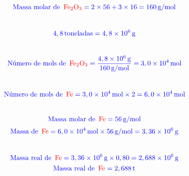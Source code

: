 \documentclass[a4paper, 12pt]{article}
\begin{document}
\begin{enumerate}
          \[
              \textcolor{blue}{\text{Massa molar de } \, \textcolor{red}{\text{Fe}_2\text{O}_3} = 2 \times 56 + 3 \times 16 = 160 \, \text{g/mol}}
          \]
          \\[10pt]
          \textcolor{blue}{}
          \[
              \textcolor{blue}{4,8 \, \text{toneladas} = 4,8 \times 10^6 \, \text{g}}
          \]
          \\[10pt]
          \textcolor{blue}{}
          \[
              \textcolor{blue}{\text{Número de mols de } \, \textcolor{red}{\text{Fe}_2\text{O}_3} = \frac{4,8 \times 10^6 \, \text{g}}{160 \, \text{g/mol}} = 3,0 \times 10^4 \, \text{mol}}
          \]
          \\[10pt]
          \textcolor{blue}{}
          \[
              \textcolor{blue}{\text{Número de mols de } \, \textcolor{red}{\text{Fe}} = 3,0 \times 10^4 \, \text{mol} \times 2 = 6,0 \times 10^4 \, \text{mol}}
          \]
          \\[10pt]
          \textcolor{blue}{}
          \[
              \textcolor{blue}{\text{Massa molar de } \, \textcolor{red}{\text{Fe}} = 56 \, \text{g/mol}}
          \]
          \[
              \textcolor{blue}{\text{Massa de }  \, \textcolor{red}{\text{Fe}} = 6,0 \times 10^4 \, \text{mol} \times 56 \, \text{g/mol} = 3,36 \times 10^6 \, \text{g}}
          \]
          \\[10pt]
          \textcolor{blue}{}
          \[
              \textcolor{blue}{\text{Massa real de } \, \textcolor{red}{\text{Fe}} = 3,36 \times 10^6 \, \text{g} \times 0,80 = 2,688 \times 10^6 \, \text{g}}
          \]
          \[
              \textcolor{blue}{\text{Massa real de } \, \textcolor{red}{\text{Fe}} = 2,688 \, \text{t}}
          \]





\end{enumerate}
\end{document}
